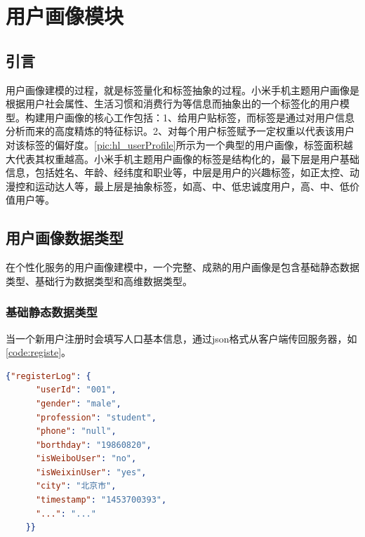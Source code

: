 
\chapter{用户画像模块}
\section{引言}
用户画像建模的过程，就是标签量化和标签抽象的过程。小米手机主题用户画像是根据用户社会属性、生活习惯和消费行为等信息而抽象出的一个标签化的用户模型。构建用户画像的核心工作包括：1、给用户贴标签，而标签是通过对用户信息分析而来的高度精炼的特征标识。2、对每个用户标签赋予一定权重以代表该用户对该标签的偏好度。\autoref{pic:hl_userProfile}所示为一个典型的用户画像，标签面积越大代表其权重越高。小米手机主题用户画像的标签是结构化的，最下层是用户基础信息，包括姓名、年龄、经纬度和职业等，中层是用户的兴趣标签，如正太控、动漫控和运动达人等，最上层是抽象标签，如高、中、低忠诚度用户，高、中、低价值用户等。


\section{用户画像数据类型}
在个性化服务的用户画像建模中，一个完整、成熟的用户画像是包含基础静态数据类型、基础行为数据类型和高维数据类型。
\subsection{基础静态数据类型}
当一个新用户注册时会填写人口基本信息，通过json格式从客户端传回服务器，如\autoref{code:registe}。
\begin{lstlisting}[language=json,firstnumber=1,label={code:registe}, caption={基础静态数据类型}]
    {"registerLog": {
      "userId": "001",
      "gender": "male",
      "profession": "student",
      "phone": "null",
      "borthday": "19860820",
      "isWeiboUser": "no",
      "isWeixinUser": "yes",
      "city": "北京市",
      "timestamp": "1453700393",
      "...": "..."
    }}
\end{lstlisting}

